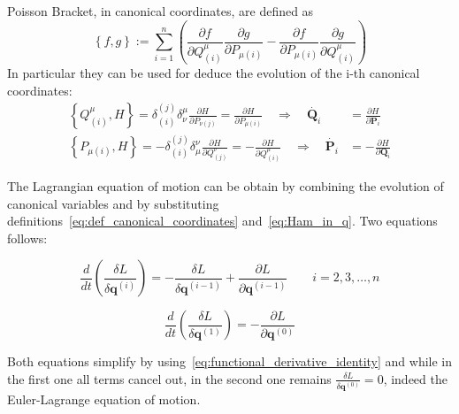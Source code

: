 \begin{enumerate}
    Poisson Bracket, in canonical coordinates, are defined as
    \begin{equation*} \label{eq:possion_braket}
      \left\{ f, g \right\} := \sum_{i=1}^{n} \left(
        \frac{\partial f}{\partial Q^{\mu}_{(i)}}
        \frac{\partial g}{\partial P_{\mu(i)}} -
        \frac{\partial f}{\partial P_{\mu(i)}}
        \frac{\partial g}{\partial Q^{\mu}_{(i)}}
      \right)
    \end{equation*}
    In particular they can be used for deduce the evolution of the i-th
    canonical coordinates:
    \begin{align*}
      \left\{ Q^{\mu}_{(i)}, H\right\}
      = \delta^{(j)}_{(i)} \delta^{\mu}_{\nu}
          \frac{\partial H}{\partial P_{\nu(j)}}
      = \frac{\partial H}{\partial P_{\mu(i)}}
      \quad \Rightarrow \quad
      \dot{\bm{Q}_i} &=  \frac{\partial H}{\partial \bm{P}_i}
      \\
      \left\{ P_{\mu(i)}, H\right\}
      = - \delta^{(j)}_{(i)} \delta^{\nu}_{\mu}
          \frac{\partial H}{\partial Q^{\nu}_{(j)}}
      = - \frac{\partial H}{\partial Q^{\mu}_{(i)}}
      \quad \Rightarrow \quad
      \dot{\bm{P}_i} &= -\frac{\partial H}{\partial \bm{Q}_i}
    \end{align*}
\end{enumerate}

The Lagrangian equation of motion can be obtain by combining the evolution of
canonical variables and by substituting
definitions~\eqref{eq:def_canonical_coordinates} and~\eqref{eq:Ham_in_q}. Two
equations follows:

\begin{equation} \label{eq:ham_to_lagr_1}
  \frac{d}{dt}\left(\frac{\delta L}{\delta \bm{q}^{(i)}}\right) = -
  \frac{\delta L}{\delta \bm{q}^{(i-1)}} +
  \frac{\partial L}{\partial \bm{q}^{(i-1)}}
  \qquad i = 2, 3, \ldots, n
\end{equation}

\begin{equation} \label{eq:ham_to_lagr_2}
  \frac{d}{dt}\left(\frac{\delta L}{\delta \bm{q}^{(1)}}\right) = -
  \frac{\partial L}{\partial \bm{q}^{(0)}}
\end{equation}

Both equations simplify by using~\eqref{eq:functional_derivative_identity} and
while in the first one all terms cancel out, in the second one remains
$\frac{\delta L}{\delta \bm{q}^{(0)}} = 0$, indeed the Euler-Lagrange equation
of motion. \\



